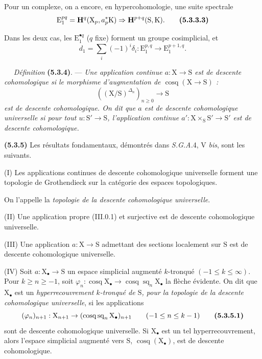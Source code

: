 \documentclass[11pt,leqno]{article}
\newcommand{\Page}[1]{\ifvmode\noindent\else\unskip\ \fi{\footnotesize\textcolor{gray}{[p.\,#1]}}\ \ignorespaces}
\begin{document}
Pour un complexe, on a encore, en hypercohomologie, une suite spectrale
\[
\mathrm{E}_{1}^{pq}=\mathbf{H}^{q}(\mathrm{X}_{p},a_{p}^{*}\mathrm{K})
\Rightarrow\mathbf{H}^{p+q}(\mathrm{S},\mathrm{K}).
\tag*{\textbf{(5.3.3.3)}}
\]

Dans les deux cas, les \(\mathrm{E}_{1}^{\bullet q}\) (\(q\) fixe) forment un groupe cosimplicial, et
\[
d_{1}=\sum_i(-1)^i\delta_i:
\mathrm{E}_{1}^{p,q}\to\mathrm{E}_{1}^{p+1,q}.
\]

\Page{15}
\textit{Définition} \textbf{(5.3.4)}. — \textit{Une application continue \(a:\mathrm{X}\to\mathrm{S}\) est de \textup{descente cohomologique} si le morphisme d’augmentation de \(\operatorname{cosq}(\mathrm{X}\to\mathrm{S})\) :}
\[
((\mathrm{X}/\mathrm{S})^{\Delta_n})_{n\geq 0}\to\mathrm{S}
\]
\textit{est de descente cohomologique. On dit que \(a\) est de \textup{descente cohomologique universelle} si pour tout \(u:\mathrm{S}'\to\mathrm{S}\), l’application continue \(a':\mathrm{X}\times_{\mathrm{S}}\mathrm{S}'\to\mathrm{S}'\) est de descente cohomologique.}

\textbf{(5.3.5)} Les résultats fondamentaux, démontrés dans \textit{S.G.A.}4, V \textit{bis}, sont les suivants.

(I) Les applications continues de descente cohomologique universelle forment une topologie de Grothendieck sur la catégorie des espaces topologiques.

On l’appelle la \textit{topologie de la descente cohomologique universelle}.

(II) Une application propre (III.0.1) et surjective est de descente cohomologique universelle.

(III) Une application \(a:\mathrm{X}\to\mathrm{S}\) admettant des sections localement sur \(\mathrm{S}\) est de descente cohomologique universelle.

(IV) Soit \(a:\mathrm{X}_{\bullet}\to\mathrm{S}\) un espace simplicial augmenté \(k\)-tronqué \((-1\leq k\leq\infty)\). Pour \(k\geq n\geq-1\), soit \(\varphi_n:\operatorname{cosq}\mathrm{X}_{\bullet}\to\operatorname{cosq}\operatorname{sq}_n\mathrm{X}_{\bullet}\) la flèche évidente. On dit que \(\mathrm{X}_{\bullet}\) est un \textit{hyperrecouvrement \(k\)-tronqué de \(\mathrm{S}\), pour la topologie de la descente cohomologique universelle}, si les applications
\[
(\varphi_n)_{n+1}:\mathrm{X}_{n+1}
\to(\operatorname{cosq}\operatorname{sq}_n\mathrm{X}_{\bullet})_{n+1}
\qquad(-1\leq n\leq k-1)
\tag*{\textbf{(5.3.5.1)}}
\]
sont de descente cohomologique universelle. Si \(\mathrm{X}_{\bullet}\) est un tel hyperrecouvrement, alors l’espace simplicial augmenté vers \(\mathrm{S}\), \(\operatorname{cosq}(\mathrm{X}_{\bullet})\), est de descente cohomologique.
\end{document}
